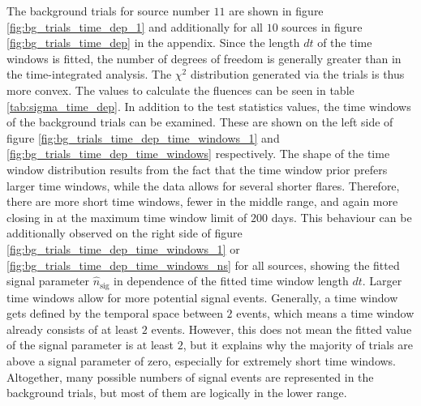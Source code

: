 The background trials for source number $\num{11}$ are shown in figure \ref{fig:bg_trials_time_dep_1} and additionally for all $\num{10}$ sources in figure \ref{fig:bg_trials_time_dep} in the appendix.
Since the length $dt$ of the time windows is fitted, the number of degrees of freedom is generally greater than in the time-integrated analysis.
The $\chi^2$ distribution generated via the trials is thus more convex.
The values to calculate the fluences can be seen in table \ref{tab:sigma_time_dep}.
In addition to the test statistics values, the time windows of the background trials can be examined.
These are shown on the left side of figure \ref{fig:bg_trials_time_dep_time_windows_1} and \ref{fig:bg_trials_time_dep_time_windows} respectively.
The shape of the time window distribution results from the fact that the time window prior prefers larger time windows, while the data allows for several shorter flares.
Therefore, there are more short time windows, fewer in the middle range, and again more closing in at the maximum time window limit of $\num{200}$ days.
This behaviour can be additionally observed on the right side of figure \ref{fig:bg_trials_time_dep_time_windows_1} or \ref{fig:bg_trials_time_dep_time_windows_ns} for all sources, showing the fitted signal parameter $\hat{n}_\text{sig}$ in dependence of the fitted time window length $dt$.
Larger time windows allow for more potential signal events.
Generally, a time window gets defined by the temporal space between $\num{2}$ events, which means a time window already consists of at least $\num{2}$ events.
However, this does not mean the fitted value of the signal parameter is at least $2$, but it explains why the majority of trials are above a signal parameter of zero, especially for extremely short time windows.
Altogether, many possible numbers of signal events are represented in the background trials, but most of them are logically in the lower range.
